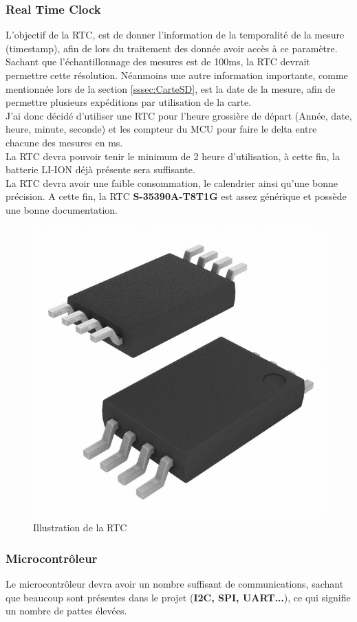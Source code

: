 {\newpage
\subsubsection{Real Time Clock}
{
    L'objectif de la RTC, est de donner l'information de la temporalité de la mesure (timestamp), afin de lors du traitement des donnée avoir accès à ce paramètre. \\
    Sachant que l'échantillonnage des mesures est de 100ms, la RTC devrait permettre cette résolution. Néanmoins une autre information importante, comme mentionnée lors de la section \ref{sssec:CarteSD}, est la date de la mesure, afin de permettre plusieurs expéditions par utilisation de la carte. \vspace{+8pt} \\
    J'ai donc décidé d'utiliser une RTC pour l'heure grossière de départ (Année, date, heure, minute, seconde) et les compteur du MCU pour faire le delta entre chacune des mesures en ms. \\

    La RTC devra pouvoir tenir le minimum de 2 heure d'utilisation, à cette fin, la batterie LI-ION déjà présente sera suffisante. \\ 
    La RTC devra avoir une faible consommation, le calendrier ainsi qu'une bonne précision. A cette fin, la RTC \textbf{S-35390A-T8T1G} est assez générique et possède une bonne documentation.
    
    \begin{figure}[h] 
        \centering
        \includegraphics[width=.4\textwidth]{Figures/RTC}
        \caption{Illustration de la RTC}
        \label{fig:RTC}
    \end{figure}
    
    
    
}
\clearpage

\subsubsection{Microcontrôleur}
{
    Le microcontrôleur devra avoir un nombre suffisant de communications, sachant que beaucoup sont présentes dans le projet (\textbf{I2C, SPI, UART...}), ce qui signifie un nombre de pattes élevées. 
    
}}
